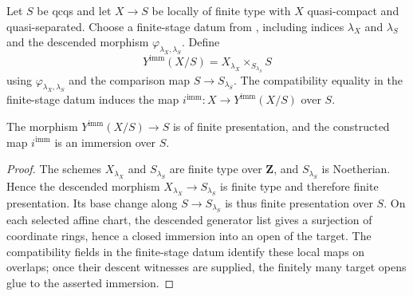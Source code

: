 \begin{definition}
  \label{def:nagata-immersion-into-fp-model}

  Let $S$ be qcqs and let $X\to S$ be locally of finite type with $X$
  quasi-compact and quasi-separated.  Choose a finite-stage datum from
  , including indices
  $\lambda_X$ and $\lambda_S$ and the descended morphism
  $\varphi_{\lambda_X,\lambda_S}$.  Define
  \[
    Y^{\mathrm{imm}}(X/S)
      =X_{\lambda_X}\times_{S_{\lambda_S}}S
  \]
  using $\varphi_{\lambda_X,\lambda_S}$ and the comparison map
  $S\to S_{\lambda_S}$.  The compatibility equality in the finite-stage
  datum induces the map $i^{\mathrm{imm}}\colon X\to Y^{\mathrm{imm}}(X/S)$
  over $S$.
\end{definition}

\begin{lemma}
  \label{lemma:nagata-immersion-into-fp-model}

  The morphism $Y^{\mathrm{imm}}(X/S)\to S$ is of finite presentation, and
  the constructed map $i^{\mathrm{imm}}$ is an immersion over $S$.
\end{lemma}

\begin{proof}
  The schemes $X_{\lambda_X}$ and $S_{\lambda_S}$ are finite type over
  $\mathbf Z$, and $S_{\lambda_S}$ is Noetherian.  Hence the descended
  morphism $X_{\lambda_X}\to S_{\lambda_S}$ is finite type and therefore
  finite presentation.  Its base change along $S\to S_{\lambda_S}$ is thus
  finite presentation over $S$.  On
  each selected affine chart, the descended generator list gives a surjection
  of coordinate rings, hence a closed immersion into an open of the target.
  The compatibility fields in the finite-stage datum identify these local
  maps on overlaps; once their descent witnesses are supplied, the finitely
  many target opens glue to the asserted immersion.
\end{proof}

